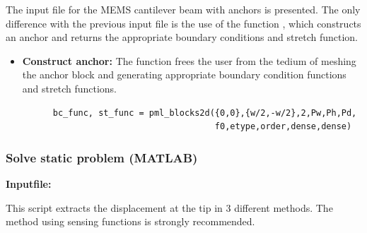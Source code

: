 \clearpage
The input file for the MEMS cantilever beam with anchors is 
presented. The only difference with the previous input file
is the use of the function , which constructs
an anchor and returns the appropriate boundary conditions and
stretch function.
\begin{itemize}

  \item{\textbf{Construct anchor:}}
  The  function frees the user from the tedium
  of meshing the anchor block and generating appropriate boundary
  condition functions and stretch functions.
  \begin{verbatim}
      bc_func, st_func = pml_blocks2d({0,0},{w/2,-w/2},2,Pw,Ph,Pd,
                                      f0,etype,order,dense,dense)
  \end{verbatim}


\end{itemize}

\clearpage
\subsubsection*{Solve static problem (MATLAB)}
\begin{flushleft}
  \textbf{Inputfile:}
  \\
\end{flushleft}
\hspace{1in}
{\footnotesize
{}
}

\clearpage
This script extracts the displacement at the tip in 3 different methods. 
The method using sensing functions is strongly recommended.

